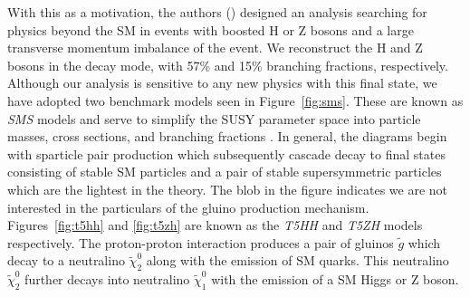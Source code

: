 With this as a motivation, the authors (\cite{CMS-SUS-17-006}) designed an analysis searching for physics beyond the SM in events with boosted H or Z bosons and a large transverse momentum imbalance of the event. We reconstruct the H and Z bosons in the \bbbar decay mode, with 57\% and 15\% branching fractions, respectively. Although our analysis is sensitive to any new physics with this final state, we have adopted two benchmark models seen in Figure~\ref{fig:sms}. These are known as \textit{SMS} models and serve to simplify the SUSY parameter space into particle masses, cross sections, and branching fractions \cite{CMS-SUS-11-016}. In general, the diagrams begin with sparticle pair production which subsequently cascade decay to final states consisting of stable SM particles and a pair of stable supersymmetric particles which are the lightest in the theory. The blob in the figure indicates we are not interested in the particulars of the gluino production mechanism. Figures~\ref{fig:t5hh} and \ref{fig:t5zh} are known as the \textit{T5HH} and \textit{T5ZH} models respectively. The proton-proton interaction produces a pair of gluinos $\tilde{g}$ which decay to a neutralino $\tilde{\chi}_{2}^{0}$ along with the emission of SM quarks. This neutralino $\tilde{\chi}_{2}^{0}$ further decays into neutralino $\tilde{\chi}_{1}^{0}$ with the emission of a SM Higgs or Z boson.

